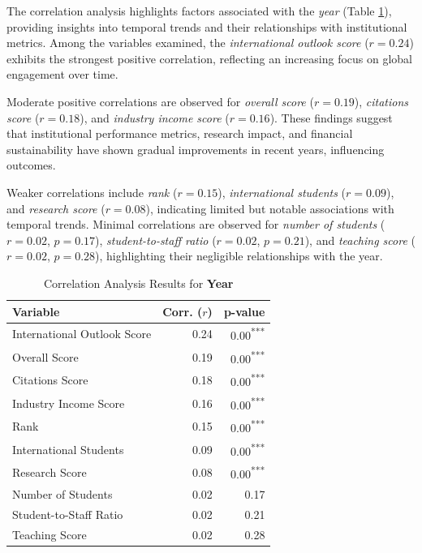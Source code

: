 \documentclass[sigconf]{acmart}
\begin{document}
The correlation analysis highlights factors associated with the \textit{year} (Table \ref{tab:correlation_year}), providing insights into temporal trends and their relationships with institutional metrics. Among the variables examined, the \textit{international outlook score} ($r = 0.24$) exhibits the strongest positive correlation, reflecting an increasing focus on global engagement over time.

Moderate positive correlations are observed for \textit{overall score} ($r = 0.19$), \textit{citations score} ($r = 0.18$), and \textit{industry income score} ($r = 0.16$). These findings suggest that institutional performance metrics, research impact, and financial sustainability have shown gradual improvements in recent years, influencing outcomes.

Weaker correlations include \textit{rank} ($r = 0.15$), \textit{international students} ($r = 0.09$), and \textit{research score} ($r = 0.08$), indicating limited but notable associations with temporal trends. Minimal correlations are observed for \textit{number of students} ($r = 0.02$, $p = 0.17$), \textit{student-to-staff ratio} ($r = 0.02$, $p = 0.21$), and \textit{teaching score} ($r = 0.02$, $p = 0.28$), highlighting their negligible relationships with the year.

\begin{table}[h!]
	\centering
	\caption{Correlation Analysis Results for \textbf{Year}}
	\label{tab:correlation_year}
	\begin{tabular}{|l|r|r|}
		\hline
		\textbf{Variable} & \textbf{Corr. ($r$)} & \textbf{p-value} \\
		\hline
		International Outlook Score & 0.24 & 0.00\textsuperscript{***} \\
		Overall Score & 0.19 & 0.00\textsuperscript{***} \\
		Citations Score & 0.18 & 0.00\textsuperscript{***} \\
		Industry Income Score & 0.16 & 0.00\textsuperscript{***} \\
		Rank & 0.15 & 0.00\textsuperscript{***} \\
		International Students & 0.09 & 0.00\textsuperscript{***} \\
		Research Score & 0.08 & 0.00\textsuperscript{***} \\
		Number of Students & 0.02 & 0.17 \\
		Student-to-Staff Ratio & 0.02 & 0.21 \\
		Teaching Score & 0.02 & 0.28 \\
		\hline
	\end{tabular}
\end{table}
\end{document}
